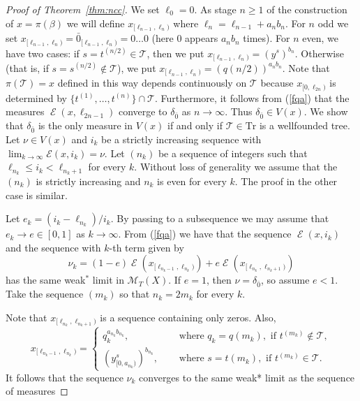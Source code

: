 \documentclass{amsart}
\theoremstyle{definition}
\newcommand{\cE}{\mathcal{E}}
\newcommand{\cM}{\mathcal{M}}
\newcommand{\tr}{\text{Tr}}
\DeclareMathOperator{\Emp}{\mathcal{E}}%
\begin{document}
\begin{proof}[Proof of Theorem~\ref{thm:ncc}]
We set $\ell_0=0$. As stage $n\ge 1$ of the construction of $x=\pi(\beta)$
we will define $x_{[\ell_{n-1},\ell_n)}$ where $\ell_n=\ell_{n-1}+ a_n b_n$.
For $n$ odd we set $x_{[\ell_{n-1},\ell_n)}={\bar{0}}_{[\ell_{n-1},\ell_n)}=0\ldots 0$
(here $0$ appears $a_nb_n$ times). For $n$ even,
we have two cases: if $s=t^{(n/2)}\in \mathcal{T}$, then we put $x_{[\ell_{n-1},\ell_n)}=(y^s)^{b_n}$.
Otherwise (that is, if
$s=s^{(n/2)}\notin \mathcal{T}$), we put $x_{[\ell_{n-1},\ell_n)}=(q(n/2))^{a_nb_n}$.
Note that $\pi(\mathcal{T})=x$ defined in this way depends continuously on $\mathcal{T}$
because $x_{[0,\ell_{2n})}$ is determined by
$\{t^{(1)},\ldots,t^{(n)}\}\cap\mathcal{T}$. Furthermore, it follows from (\ref{fqa}) that the
measures $\Emp(x, \ell_{2n-1})$ converge to $\delta_{\bar 0}$ as $n\to\infty$.
Thus $\delta_{\bar 0} \in V(x)$.
We show that $\delta_{\bar 0}$ is the only measure in $V(x)$ if and only if
$\mathcal{T} \in \tr$ is a wellfounded tree.
Let $\nu \in V(x)$ and $i_k$ be a strictly increasing sequence with
$\lim_{k\to\infty} \cE(x, i_k)=\nu$. Let $(n_k)$
be a sequence of integers such that $\ell_{n_k} \leq i_k < \ell_{n_{k}+1}$ for every $k$.
Without loss of generality we
assume that the $(n_k)$ is strictly increasing and $n_k$ is even for every $k$.
The proof in the other case is similar.

Let %
$e_k=(i_k-\ell_{n_k})/i_k$.
By passing to a subsequence we may assume that $e_k\to e\in [0,1]$ as $k\to\infty$. From
(\ref{fqa}) we have that the sequence $\Emp(x, i_k)$ and
the sequence with $k$-th term given by
\[\nu_k=(1-e) \Emp(x_{[\ell_{n_{k}-1},\ell_{n_k})})+ e\Emp(x_{[\ell_{n_{k}},\ell_{n_k+1})})\]
has the same weak${}^*$ limit in $\cM_T(X)$.
If $e=1$, then $\nu=\delta_{\bar{0}}$, so assume $e<1$.
Take the sequence $(m_k)$ so that $n_k=2m_k$ for every $k$.

Note that $x_{[\ell_{n_{k}},\ell_{n_k+1})}$ is a sequence containing only zeros. Also,
\begin{equation} \label{eqn:konrad19}
x_{[\ell_{n_{k}-1},\ell_{n_k})}=
  \begin{cases}
    q_k^{a_{n_k}b_{n_k}}, \quad & \textrm{ where } q_k=q(m_k),\textrm{ if } t^{(m_k)}\notin\mathcal{T}, \\
    (y^s_{[0, a_{n_k})})^{b_{n_k}}, \quad & \textrm{ where } s = t(m_k), \textrm{ if }  t^{(m_k)} \in \mathcal{T}.
  \end{cases}
\end{equation}
It follows that the sequence $\nu_k$ converges to the same weak* limit as the sequence of measures


\end{proof}
\end{document}
